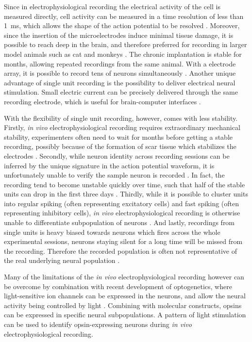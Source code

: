 Since in electrophysiological recording the electrical activity of the cell is measured directly, cell activity can be measured in a time resolution of less than \SI{1}{\ms}, which allows the shape of the action potential to be resolved \citep{lutcke13}. Moreover, since the insertion of the microelectrodes induce minimal tissue damage, it is possible to reach deep in the brain, and therefore preferred for recording in larger model animals such as cat and monkeys \citep{lutcke13}. The chronic implantation is stable for months, allowing repeated recordings from the same animal. With a electrode array, it is possible to record tens of neurons simultaneously \citep{lutcke13}. Another unique advantage of single unit recording is the possibility to deliver electrical neural stimulation. Small electric current can be precisely delivered through the same recording electrode, which is useful for brain-computer interfaces \citep{hatsopoulos09}. 

With the flexibility of single unit recording, however, comes with less stability. Firstly, \textit{in vivo} electrophysiological recording requires extraordinary mechanical stability, experimenters often need to wait for months before getting a stable recording, possibly because of the formation of scar tissue which stabilizes the electrodes \citep{jackson07}. Secondly, while neuron identity across recording sessions can be inferred by the unique signature in the action potential waveform, it is unfortunately unable to verify the sample neuron is recorded \citep{rousche98, schmitzer-torbert04, tolias07}. In fact, the recording tend to become unstable quickly over time, such that half of the stable units can drop in the first three days \citep{fraser12}. Thirdly, while it is possible to cluster units into regular spiking (often representing excitatory cells) and fast spiking (often representing inhibitory cells), \textit{in vivo} electrophysiological recording is otherwise unable to differentiate subpopulation of neurons \citep{connors90}. And lastly, recordings from single units is heavy biased towards neurons which fires across the whole experimental sessions, neurons staying silent for a long time will be missed from the recording. Therefore the recorded population is often not representative of the real underlying neural population \citep{lutcke13}. 

Many of the limitations of the \textit{in vivo} electrophysiological recording however can be overcome by combination with recent development of optogenetics, where light-sensitive ion channels can be expressed in the neurons, and allow the neural activity being controlled by light \citep{yizhar11}. Combining with molecular constructs, opsins can be expressed in specific neural subpopulations. A pattern of light stimulation can be used to identify opsin-expressing neurons during \textit{in vivo} electrophysiological recording\citep{zhao11}. 

